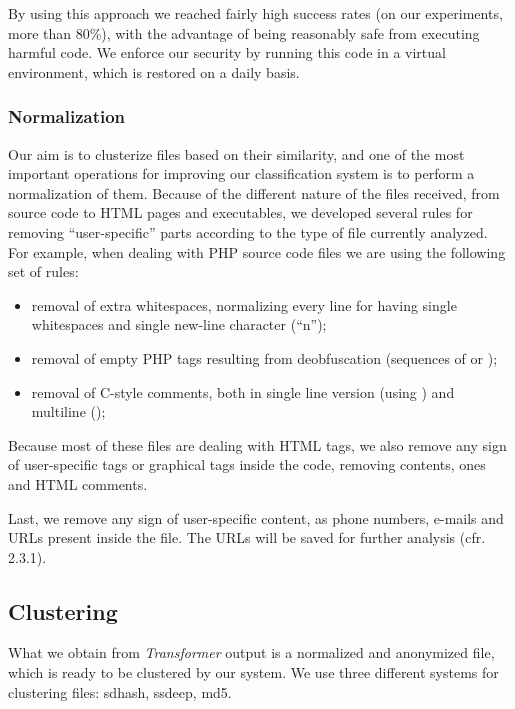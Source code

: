 By using this approach we reached fairly high success rates (on our experiments, more than 80\%), with the advantage of being reasonably safe from executing harmful code. We enforce our security by running this code in a virtual environment, which is restored on a daily basis.

\subsubsection{Normalization}
Our aim is to clusterize files based on their similarity, and one of the most important operations for improving our classification system is to perform a normalization of them.
Because of the different nature of the files received, from source code to HTML pages and executables, we developed several rules for removing ``user-specific'' parts according to the type of file currently analyzed.
For example, when dealing with PHP source code files we are using the following set of rules:
\begin{itemize}
\item removal of extra whitespaces, normalizing every line for having single whitespaces and single new-line character (``\bs n'');
\item removal of empty PHP tags resulting from deobfuscation (sequences of  or ); %
\item removal of C-style comments, both in single line version (using \code{//}) and multiline ();
\end{itemize}

Because most of these files are dealing with HTML tags, we also remove any sign of user-specific tags or graphical tags inside the code, removing  contents,  ones and HTML comments.

Last, we remove any sign of user-specific content, as phone numbers, e-mails and URLs present inside the file. The URLs will be saved for further analysis (cfr. 2.3.1).

\subsection{Clustering}
What we obtain from \emph{Transformer} output is a normalized and anonymized file, which is ready to be clustered by our system. We use three different systems for clustering files: sdhash, ssdeep, md5.

